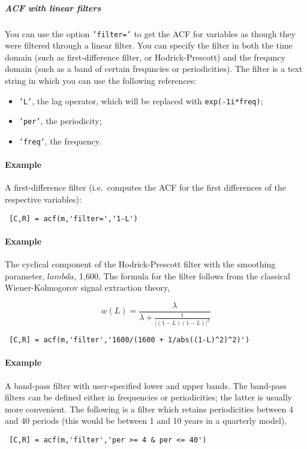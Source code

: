  \subparagraph{ACF with linear filters}
 
 You can use the option \texttt{'filter='} to get the ACF for variables
 as though they were filtered through a linear filter. You can specify
 the filter in both the time domain (such as first-difference filter, or
 Hodrick-Prescott) and the frequncy domain (such as a band of certain
 frequncies or periodicities). The filter is a text string in which you
 can use the following references:
 
 \begin{itemize}
 \item
   \texttt{'L'}, the lag operator, which will be replaced with
   \texttt{exp(-1i*freq)};
 \item
   \texttt{'per'}, the periodicity;
 \item
   \texttt{'freq'}, the frequency.
 \end{itemize}
 
 \paragraph{Example}
 
 A first-difference filter (i.e.~computes the ACF for the first
 differences of the respective variables):
 
 \begin{verbatim}
 [C,R] = acf(m,'filter=','1-L')
 \end{verbatim}
 
 \paragraph{Example}
 
 The cyclical component of the Hodrick-Prescott filter with the smoothing
 parameter, $lambda$, 1,600. The formula for the filter follows from the
 classical Wiener-Kolmogorov signal extraction theory,
 
 \[w(L) = \frac{\lambda}{\lambda + \frac{1}{ | (1-L)(1-L) | ^2}}\]
 
 \begin{verbatim}
 [C,R] = acf(m,'filter','1600/(1600 + 1/abs((1-L)^2)^2)')
 \end{verbatim}
 
 \paragraph{Example}
 
 A band-pass filter with user-specified lower and upper bands. The
 band-pass filters can be defined either in frequencies or periodicities;
 the latter is usually more convenient. The following is a filter which
 retains periodicities between 4 and 40 periods (this would be between 1
 and 10 years in a quarterly model),
 
 \begin{verbatim}
 [C,R] = acf(m,'filter','per >= 4 & per <= 40')
 \end{verbatim}


